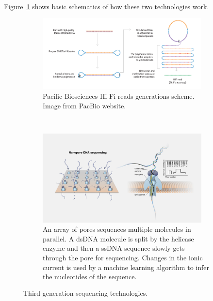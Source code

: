 Figure~\ref{fig:sequencing_technologies} shows basic schematics of how these two technologies work.\\ 
\begin{figure}[h!]
	\centering
	\begin{subfigure}[b]{0.95\textwidth}
		\centering
		\includegraphics[width=0.95\textwidth]{figures/background/hifi_pacbio.png}
		\caption{Pacific Biosciences Hi-Fi reads generations scheme. Image from PacBio website.} 
	\end{subfigure}%
	\\
	\begin{subfigure}[b]{0.95\textwidth}
		\centering
		\includegraphics[width=0.95\textwidth]{figures/background/nanopore_sequencing.jpg}
		\caption{An array of pores sequences multiple molecules in parallel. A dsDNA molecule is split by the helicase enzyme and then a ssDNA sequence slowly gets through the pore for sequencing. Changes in the ionic current is used by a machine learning algorithm to infer the nucleotides of the sequence.} 
	\end{subfigure}%
	\caption{Third generation sequencing technologies.}
	\label{fig:sequencing_technologies}
\end{figure}

